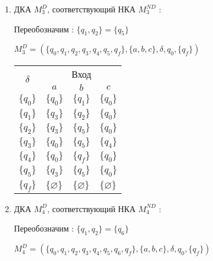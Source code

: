 \begin{enumerate}[label=(\roman{*})]
\begin{enumerate}
		\item ДКА $M^{D}_3$, соответствующий НКА  $M^{ND}_3$ :
		\newline
		
		Переобозначим : $\{q_1, q_2\} = \{q_5\}$ 
		\newline 
		
		$M^{D}_3 = (\{q_0, q_1, q_2, q_3, q_4, q_5, q_f\}, \{a, b, c\}, \delta, q_0, \{q_f\})$
		
			\begin{center}
			\begin{tabular}{llll}
				\toprule
				\multicolumn{1}{c}{\multirow{2}{*}{\Large $\delta$}}
				& \multicolumn{3}{c}{Вход} \\
				\cmidrule(rl){2-4}
				& \multicolumn{1}{c}{$a$}
				& \multicolumn{1}{c}{$b$} 
				& \multicolumn{1}{c}{$c$} \\
				\midrule
				$\{q_0\}$       & $\{q_0\}$      		 & $\{q_1\}$     &$\{q_0\}$  \\
				$\{q_1\}$       & $\{q_3\}$    			 & $\{q_2\}$     &$\{q_0\}$ \\
				$\{q_2\}$       & $\{q_3\}$    			 & $\{q_5\}$     &$\{q_0\}$  \\
				$\{q_3\}$       & $\{q_0\}$    			 & $\{q_5\}$     &$\{q_4\}$  \\
				$\{q_4\}$       & $\{q_0\}$    			 & $\{q_f\}$     &$\{q_0\}$  \\
				$\{q_5\}$       & $\{q_3\}$    			 & $\{q_5\}$     &$\{q_0\}$ \\
				$\{q_f\}$       & $\{\varnothing\}$    	 & $\{\varnothing\}$     &$\{\varnothing\}$  \\
				\bottomrule
			\end{tabular}
		\end{center}
		
		\item ДКА $M^{D}_4$, соответствующий НКА  $M^{ND}_4$ :
		\newline
		
		Переобозначим : $\{q_1, q_2\} = \{q_6\}$ 
		\newline 
		
		$M^{D}_4 = (\{q_0, q_1, q_2, q_3, q_4, q_5, q_6, q_f\}, \{a, b, c\}, \delta, q_0, \{q_f\})$
		\newline
			

\end{enumerate}
\end{enumerate}
